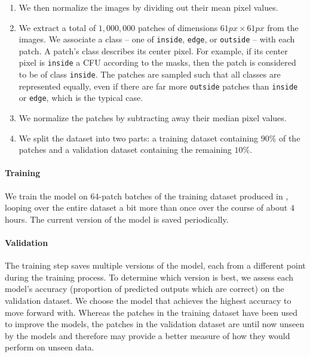 \documentclass[10pt,letterpaper]{article}
\begin{document}
\begin{enumerate}
            \item
                We then normalize the images by dividing out their mean pixel values.
        
            \item
                We extract a total of $1,000,000$ patches of dimensions $61px \times 61px$ from the images. We associate a class -- one of \texttt{inside}, \texttt{edge}, or \texttt{outside} -- with each patch. A patch's class describes its center pixel. For example, if its center pixel is \texttt{inside} a CFU according to the masks, then the patch is considered to be of class \texttt{inside}. The patches are sampled such that all classes are represented equally, even if there are far more \texttt{outside} patches than \texttt{inside} or \texttt{edge}, which is the typical case.
        
            \item
                We normalize the patches by subtracting away their median pixel values.
        
            \item
                We split the dataset into two parts: a training dataset containing $90\%$ of the patches and a validation dataset containing the remaining $10\%$.
    
        \end{enumerate}


    \paragraph*{Training}
        We train the model on $64$-patch batches of the training dataset produced in , looping over the entire dataset a bit more than once over the course of about $4$ hours. The current version of the model is saved periodically.

    \paragraph*{Validation}
        The training step saves multiple versions of the model, each from a different point during the training process. To determine which version is best, we assess each model's accuracy (proportion of predicted outputs which are correct) on the validation dataset. We choose the model that achieves the highest accuracy to move forward with. Whereas the patches in the training dataset have been used to improve the models, the patches in the validation dataset are until now unseen by the models and therefore may provide a better measure of how they would perform on unseen data.
\end{document}
